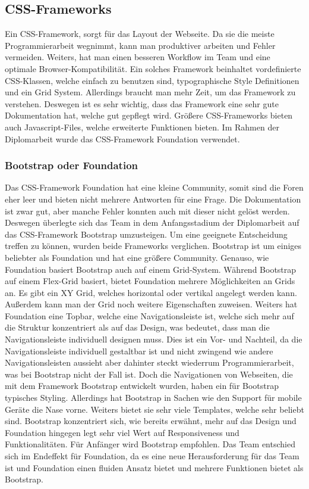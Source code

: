 \subsection{CSS-Frameworks} 
Ein CSS-Framework, sorgt für das Layout der Webseite. Da sie die meiste Programmierarbeit wegnimmt, kann man produktiver arbeiten und Fehler vermeiden. Weiters, hat man einen besseren Workflow im Team und eine optimale Browser-Kompatibilität. 
Ein solches Framework beinhaltet vordefinierte CSS-Klassen, welche einfach zu benutzen sind, typographische Style Definitionen und ein Grid System.  
Allerdings braucht man mehr Zeit, um das Framework zu verstehen. Deswegen ist es sehr wichtig, dass das Framework eine sehr gute Dokumentation hat, welche gut gepflegt wird. Größere CSS-Frameworks bieten auch Javascript-Files, welche erweiterte Funktionen bieten. Im Rahmen der Diplomarbeit wurde das CSS-Framework Foundation verwendet.

\subsubsection{Bootstrap oder Foundation}
Das CSS-Framework Foundation hat eine kleine Community, somit sind die Foren eher leer und bieten nicht mehrere Antworten für eine Frage. Die Dokumentation ist zwar gut, aber manche Fehler konnten auch mit dieser nicht gelöst werden. Deswegen überlegte sich das Team in dem Anfangsstadium der Diplomarbeit auf das CSS-Framework Bootstrap umzusteigen. Um eine geeignete Entscheidung treffen zu können, wurden beide Frameworks verglichen. Bootstrap ist um einiges beliebter als Foundation und hat eine größere Community. Genauso, wie Foundation basiert Bootstrap auch auf einem Grid-System. Während Bootstrap auf einem Flex-Grid basiert, bietet Foundation mehrere Möglichkeiten an Grids an. Es gibt ein XY Grid, welches horizontal oder vertikal angelegt werden kann. Außerdem kann man der Grid noch weitere Eigenschaften zuweisen.   Weiters hat Foundation eine Topbar, welche eine Navigationsleiste ist, welche sich mehr auf die Struktur konzentriert als auf das Design, was bedeutet, dass man die Navigationsleiste individuell designen muss. Dies ist ein Vor- und Nachteil, da die Navigationsleiste individuell gestaltbar ist und nicht zwingend wie andere Navigationsleisten aussieht aber dahinter steckt wiederrum Programmierarbeit, was bei Bootstrap nicht der Fall ist. Doch die Navigationen von Webseiten, die mit dem Framework Bootstrap entwickelt wurden, haben ein für Bootstrap typisches Styling.   Allerdings hat Bootstrap in Sachen wie den Support für mobile Geräte die Nase vorne. Weiters bietet sie sehr viele Templates, welche sehr beliebt sind. Bootstrap konzentriert sich, wie bereits erwähnt, mehr auf das Design und Foundation hingegen legt sehr viel Wert auf Responsiveness und Funktionalitäten. Für Anfänger wird Bootstrap empfohlen. Das Team entschied sich im Endeffekt für Foundation, da es eine neue Herausforderung für das Team ist und Foundation einen fluiden Ansatz bietet und mehrere Funktionen bietet als Bootstrap. 


